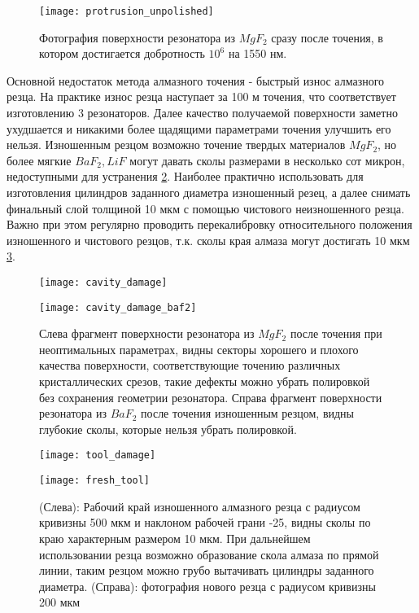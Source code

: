 \begin{figure}[ht]
\centering
  \texttt{[image: protrusion\_unpolished]}
  \caption{Фотография поверхности резонатора из $MgF_2$ сразу после точения, в котором достигается добротность $10^6$ на 1550 нм.}
  \label{protrusion_unpolished}
\end{figure}

Основной недостаток метода алмазного точения - быстрый износ алмазного резца. На практике износ резца наступает за 100 м точения, что соответствует изготовлению 3 резонаторов. Далее качество получаемой поверхности заметно ухудшается и никакими более щадящими параметрами точения улучшить его нельзя. Изношенным резцом возможно точение твердых материалов $MgF_2$, но более мягкие $BaF_2, LiF$ могут давать сколы размерами в несколько сот микрон, недоступными для устранения \ref{cavity_damage}. Наиболее практично использовать для изготовления цилиндров заданного диаметра изношенный резец, а далее снимать финальный слой толщиной 10 мкм с помощью чистового неизношенного резца. Важно при этом регулярно проводить перекалибровку относительного положения изношенного и чистового резцов, т.к. сколы края алмаза могут достигать 10 мкм \ref{tool_damage}.

\begin{figure}[ht]
  \begin{minipage}[ht]{0.49\linewidth}\centering
    \texttt{[image: cavity\_damage]}
  \end{minipage}
  \hfill
  \begin{minipage}[ht]{0.49\linewidth}\centering
    \texttt{[image: cavity\_damage\_baf2]}
  \end{minipage}
  \caption{Слева фрагмент поверхности резонатора из $MgF_2$ после точения при неоптимальных параметрах, видны секторы хорошего и плохого качества поверхности, соответствующие точению различных кристаллических срезов, такие дефекты можно убрать полировкой без сохранения геометрии резонатора. Справа фрагмент поверхности резонатора из $BaF_2$ после точения изношенным резцом, видны глубокие сколы, которые нельзя убрать полировкой.}
  \label{cavity_damage}
\end{figure}

\begin{figure}[ht]
  \begin{minipage}[ht]{0.49\linewidth}\centering
    \texttt{[image: tool\_damage]}
  \end{minipage}
  \hfill
  \begin{minipage}[ht]{0.49\linewidth}\centering
    \texttt{[image: fresh\_tool]}
  \end{minipage}
  \caption{(Слева): Рабочий край изношенного алмазного резца с радиусом кривизны 500 мкм и наклоном рабочей грани -25, видны сколы по краю характерным размером 10 мкм. При дальнейшем использовании резца возможно образование скола алмаза по прямой линии, таким резцом можно грубо вытачивать цилиндры заданного диаметра. (Справа): фотография нового резца с радиусом кривизны 200 мкм}
  \label{tool_damage}
\end{figure}


